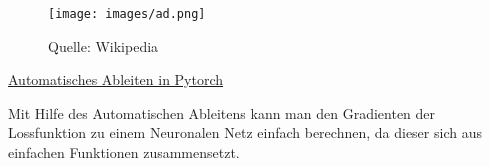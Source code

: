 \begin{figure}[H]
      \centering
    \texttt{[image: images/ad.png]}
      \caption{Quelle: Wikipedia}
\end{figure}

\href{https://pytorch.org/tutorials/beginner/blitz/autograd_tutorial.html}{Automatisches Ableiten  in Pytorch}

Mit Hilfe des Automatischen Ableitens kann man den Gradienten der Lossfunktion zu einem Neuronalen Netz einfach berechnen, da dieser sich aus einfachen Funktionen zusammensetzt.






